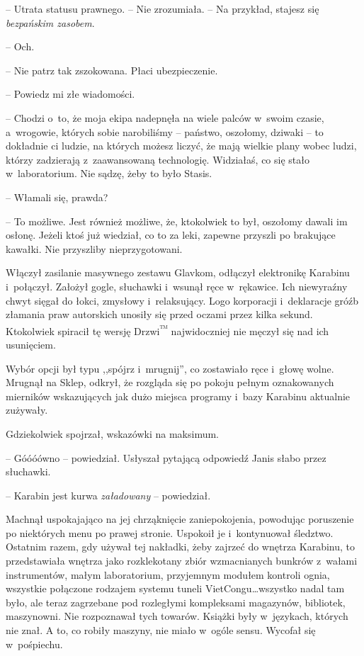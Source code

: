 \documentclass[oneside,polish,11pt,sfheadings]{mwbk}
\begin{document}
-- Utrata statusu prawnego. -- Nie zrozumiała. -- Na przykład, stajesz się
\emph{bezpańskim zasobem}.

-- Och.

-- Nie patrz tak zszokowana. Płaci ubezpieczenie.

-- Powiedz mi złe wiadomości.

-- Chodzi o~to, że moja ekipa nadepnęła na wiele palców w~swoim czasie, a~wrogowie, których sobie narobiliśmy -- państwo, oszołomy, dziwaki -- to
dokładnie ci ludzie, na których możesz liczyć, że mają wielkie plany
wobec ludzi, którzy zadzierają z~zaawansowaną technologię. Widziałaś, co
się stało w~laboratorium. Nie sądzę, żeby to było Stasis.

-- Włamali się, prawda?

-- To możliwe. Jest również możliwe, że, ktokolwiek to był, oszołomy
dawali im osłonę. Jeżeli ktoś już wiedział, co to za leki, zapewne
przyszli po brakujące kawałki. Nie przyszliby nieprzygotowani.

Włączył zasilanie masywnego zestawu Glavkom, odłączył elektronikę
Karabinu i~połączył. Założył gogle, słuchawki i~wsunął ręce w~rękawice.
Ich niewyraźny chwyt sięgał do łokci, zmysłowy i~relaksujący. Logo
korporacji i~deklaracje gróźb złamania praw autorskich unosiły się przed
oczami przez kilka sekund. Ktokolwiek spiracił tę wersję
Drzwi\textsuperscript{™} najwidoczniej nie męczył się nad ich usunięciem.

Wybór opcji był typu ,,spójrz i~mrugnij'', co zostawiało ręce i~głowę
wolne. Mrugnął na Sklep, odkrył, że rozgląda się po pokoju pełnym
oznakowanych mierników wskazujących jak dużo miejsca programy i~bazy
Karabinu aktualnie zużywały.

Gdziekolwiek spojrzał, wskazówki na maksimum.

-- Góóóówno -- powiedział. Usłyszał pytającą odpowiedź Janis słabo przez
słuchawki.

-- Karabin jest kurwa \emph{załadowany} -- powiedział.

Machnął uspokajająco na jej chrząknięcie zaniepokojenia, powodując
poruszenie po niektórych menu po prawej stronie. Uspokoił je i~kontynuował śledztwo. Ostatnim razem, gdy używał tej nakładki, żeby
zajrzeć do wnętrza Karabinu, to przedstawiała wnętrza jako rozklekotany
zbiór wzmacnianych bunkrów z~wałami instrumentów, małym laboratorium,
przyjemnym modułem kontroli ognia, wszystkie połączone rodzajem systemu
tuneli VietCongu\ldots wszystko nadal tam było, ale teraz zagrzebane pod
rozległymi kompleksami magazynów, bibliotek, maszynowni. Nie rozpoznawał
tych towarów. Książki były w~językach, których nie znał. A to, co robiły
maszyny, nie miało w~ogóle sensu. Wycofał się w~pośpiechu.
\end{document}
